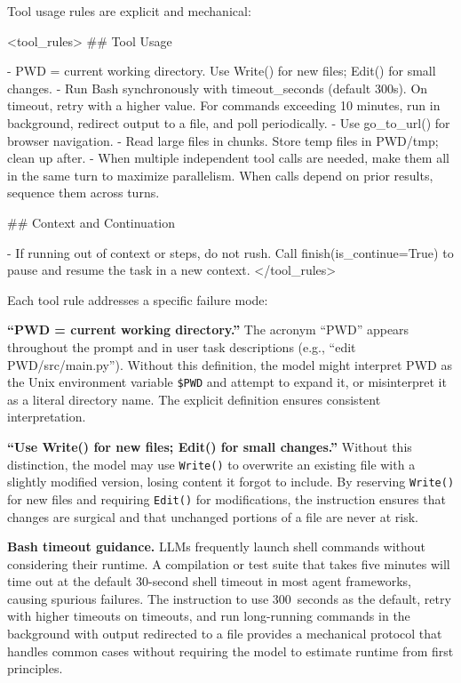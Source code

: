 \documentclass{article}
\begin{document}
Tool usage rules are explicit and mechanical:

\begin{prompt}
<tool_rules>
## Tool Usage

- PWD = current working directory. Use Write() for new
  files; Edit() for small changes.
- Run Bash synchronously with timeout_seconds (default
  300s). On timeout, retry with a higher value.  For
  commands exceeding 10 minutes, run in background,
  redirect output to a file, and poll periodically.
- Use go_to_url() for browser navigation.
- Read large files in chunks. Store temp files in
  PWD/tmp; clean up after.
- When multiple independent tool calls are needed, make
  them all in the same turn to maximize parallelism.
  When calls depend on prior results, sequence them
  across turns.

## Context and Continuation

- If running out of context or steps, do not rush. Call
  finish(is_continue=True) to pause and resume the task
  in a new context.
</tool_rules>
\end{prompt}

Each tool rule addresses a specific failure mode:

\textbf{``PWD = current working directory.''}  The acronym ``PWD'' appears throughout the prompt and in user task descriptions (e.g., ``edit PWD/src/main.py'').  Without this definition, the model might interpret PWD as the Unix environment variable \texttt{\$PWD} and attempt to expand it, or misinterpret it as a literal directory name.  The explicit definition ensures consistent interpretation.

\textbf{``Use Write() for new files; Edit() for small changes.''}  Without this distinction, the model may use \texttt{Write()} to overwrite an existing file with a slightly modified version, losing content it forgot to include.  By reserving \texttt{Write()} for new files and requiring \texttt{Edit()} for modifications, the instruction ensures that changes are surgical and that unchanged portions of a file are never at risk.

\textbf{Bash timeout guidance.}  LLMs frequently launch shell commands without considering their runtime.  A compilation or test suite that takes five minutes will time out at the default 30-second shell timeout in most agent frameworks, causing spurious failures.  The instruction to use 300~seconds as the default, retry with higher timeouts on timeouts, and run long-running commands in the background with output redirected to a file provides a mechanical protocol that handles common cases without requiring the model to estimate runtime from first principles.
\end{document}
